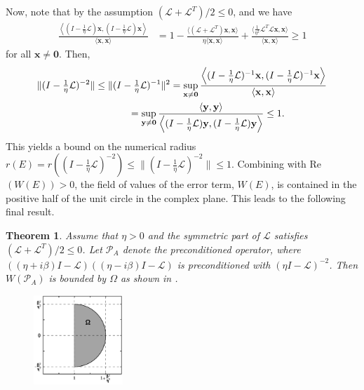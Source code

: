 \documentclass[a4paper,10pt]{article}
\newtheorem{theorem}{Theorem}
\begin{document}
Now, note that by the assumption $(\mathcal{L}+\mathcal{L}^T)/2 \leq 0$, and we have
%
\begin{align}\label{eq:norm1}
\frac{\left\langle (I - \tfrac{1}{\eta}\mathcal{L})\mathbf{x},(I - \tfrac{1}{\eta}\mathcal{L})\mathbf{x}\right\rangle}
	{\langle\mathbf{x},\mathbf{x}\rangle} 
& = 1 - \frac{\langle (\mathcal{L} + \mathcal{L}^T )
	\mathbf{x},\mathbf{x}\rangle}{\eta \langle\mathbf{x},\mathbf{x}\rangle} +
	\frac{\langle \tfrac{1}{\eta^2}\mathcal{L}^T\mathcal{L}\mathbf{x},
	\mathbf{x}\rangle}{\langle\mathbf{x},\mathbf{x}\rangle}
\geq 1
\end{align}
%
for all $\mathbf{x}\neq\mathbf{0}$. Then,
%
\begin{align}\label{eq:norm1}
\|(I - \tfrac{1}{\eta}\mathcal{L})^{-2}\| \leq \|(I - \tfrac{1}{\eta}\mathcal{L})^{-1}\|^2
& = \sup_{\mathbf{x}\neq\mathbf{0}} 
	\frac{\left\langle (I - \tfrac{1}{\eta}\mathcal{L})^{-1}\mathbf{x},
	(I - \tfrac{1}{\eta}\mathcal{L})^{-1}\mathbf{x}\right\rangle}
	{\langle\mathbf{x},\mathbf{x}\rangle} \\
&\hspace{-10ex}= \sup_{\mathbf{y}\neq\mathbf{0}} 
	\frac{\langle\mathbf{y},\mathbf{y}\rangle}{\left\langle (I - \tfrac{1}{\eta}\mathcal{L})\mathbf{y},
	(I - \tfrac{1}{\eta}\mathcal{L})\mathbf{y}\right\rangle}
\leq 1.
\end{align}
%
This yields a bound on the numerical radius $r(E) = r((I - \tfrac{1}{\eta}\mathcal{L})^{-2})
\leq \|(I - \tfrac{1}{\eta}\mathcal{L})^{-2}\|\leq 1$. Combining with Re$(W(E)) > 0$,
the field of values of the error term, $W(E)$, is contained in the positive half of the
unit circle in the complex plane. This leads to the following final result. 

%
\begin{theorem}\label{th:fov}
Assume that $\eta > 0$ and the symmetric part of $\mathcal{L}$ satisfies
$(\mathcal{L}+\mathcal{L}^T)/2 \leq 0$. Let $\mathcal{P}_A$ denote the preconditioned
operator, where $((\eta + i\beta)I - \mathcal{L})((\eta - i\beta)I - \mathcal{L})$ is
preconditioned with $(\eta I - \mathcal{L})^{-2}$. Then $W(\mathcal{P}_A)$ is bounded
by $\Omega$ as shown in .
\begin{figure}[h!]
\centering
\includegraphics[width = 0.3\textwidth]{fov.pdf}
\caption{}
\label{fig:bound}
\end{figure}
\end{theorem}
%
\end{document}
